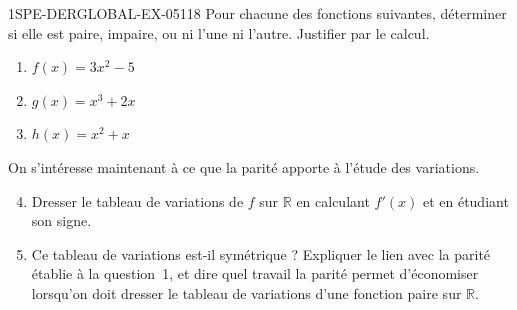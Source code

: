 \begin{exercice}{1SPE-DERGLOBAL-EX-051}{1}{8}
Pour chacune des fonctions suivantes, déterminer si elle est paire, impaire, ou ni l'une ni l'autre. Justifier par le calcul.
\begin{enumerate}
  \item $f(x) = 3x^2 - 5$
  \item $g(x) = x^3 + 2x$
  \item $h(x) = x^2 + x$
\end{enumerate}
\medskip
On s'intéresse maintenant à ce que la parité apporte à l'étude des variations.
\begin{enumerate}
  \setcounter{enumi}{3}
  \item Dresser le tableau de variations de $f$ sur $\mathbb{R}$ en calculant
    $f'(x)$ et en étudiant son signe.
  \item Ce tableau de variations est-il symétrique ? Expliquer le lien avec la
    parité établie à la question~1, et dire quel travail la parité permet
    d'économiser lorsqu'on doit dresser le tableau de variations d'une fonction
    paire sur $\mathbb{R}$.
\end{enumerate}
\end{exercice}
